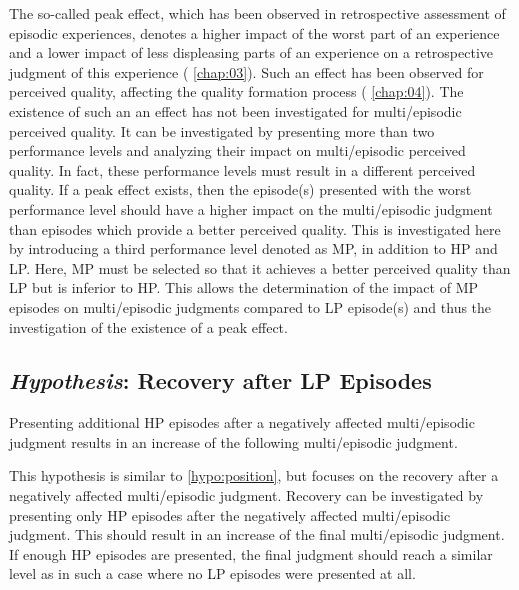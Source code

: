 The so-called peak effect, which has been observed in retrospective assessment of episodic experiences, denotes a higher impact of the worst part of an experience and a lower impact of less displeasing parts of an experience on a retrospective judgment of this experience (\cf{} \autoref{chap:03}).
Such an effect has been observed for perceived quality, affecting the quality formation process (\cf{} \autoref{chap:04}).
The existence of such an an effect has not been investigated for multi\-/episodic perceived quality.
It can be investigated by presenting more than two performance levels and analyzing their impact on multi\-/episodic perceived quality.
In fact, these performance levels must result in a different perceived quality.
If a peak effect exists, then the episode(s) presented with the worst performance level should have a higher impact on the multi\-/episodic judgment than episodes which provide a better perceived quality.
This is investigated here by introducing a third performance level denoted as \ac{MP}, in addition to \ac{HP} and \ac{LP}.
Here, \ac{MP} must be selected so that it achieves a better perceived quality than \ac{LP} but is inferior to \ac{HP}.
This allows the determination of the impact of \ac{MP} episodes on multi\-/episodic judgments compared to \ac{LP} episode(s) and thus the investigation of the existence of a peak effect.



\subsection[H5: Recovery after \acs{LP} Episodes]{\emph{Hypothesis}: Recovery after \acs{LP} Episodes}
\begin{hypothesis}\label{hypo:recovery}
Presenting additional \ac{HP} episodes after a negatively affected multi\-/episodic judgment results in an increase of the following multi\-/episodic judgment.
\end{hypothesis}

This hypothesis is similar to \autoref{hypo:position}, but focuses on the recovery after a negatively affected multi\-/episodic judgment.
Recovery can be investigated by presenting only \ac{HP} episodes after the negatively affected multi\-/episodic judgment.
This should result in an increase of the final multi\-/episodic judgment.
If enough \ac{HP} episodes are presented, the final judgment should reach a similar level as in such a case where no \ac{LP} episodes were presented at all.

